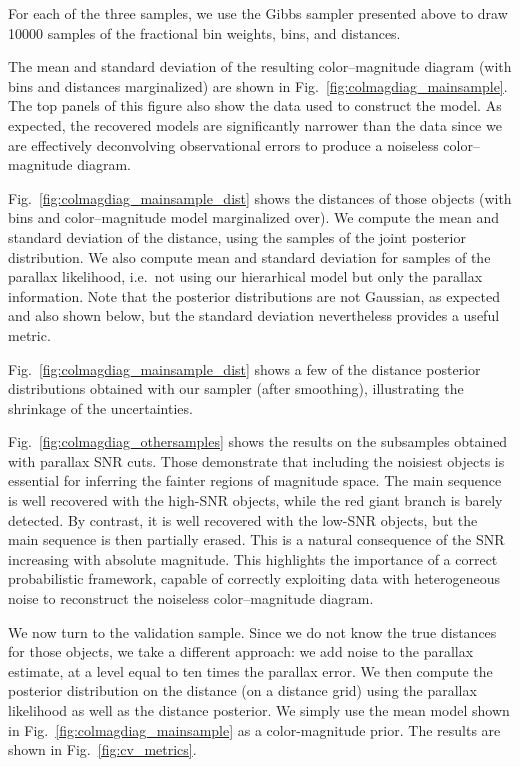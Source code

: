 \documentclass[manuscript, letterpaper]{aastex6}
\newcommand{\ie}{{{i.e.}~}}
\newcommand{\figref}[1]{{\xspace}Fig.~\ref{#1}}
\begin{document}
For each of the three samples, we use the Gibbs sampler presented above to draw 10000 samples of the fractional bin weights, bins, and distances. 

The mean and standard deviation of the resulting color--magnitude diagram (with bins and distances marginalized) are shown in \figref{fig:colmagdiag_mainsample}.
The top panels of this figure also show the data used to construct the model.
As expected, the recovered models are significantly narrower than the data since we are effectively deconvolving observational errors to produce a noiseless color--magnitude diagram. 


\figref{fig:colmagdiag_mainsample_dist} shows the distances of those objects (with bins and color--magnitude model marginalized over). 
We compute the mean and standard deviation of the distance, using the samples of the joint posterior distribution. 
We also compute mean and standard deviation for samples of the parallax likelihood, \ie not using our hierarhical model but only the parallax information.
Note that the posterior distributions are not Gaussian, as expected and also shown below, but the standard deviation nevertheless provides a useful metric. 

\figref{fig:colmagdiag_mainsample_dist} shows a few of the distance posterior distributions obtained with our sampler (after smoothing), illustrating the shrinkage of the uncertainties.

\figref{fig:colmagdiag_othersamples} shows the results on the subsamples obtained with parallax SNR cuts. 
Those demonstrate that including the noisiest objects is essential for inferring the fainter regions of magnitude space.
The main sequence is well recovered with the high-SNR objects, while the red giant branch is barely detected. 
By contrast, it is well recovered with the low-SNR objects, but the main sequence is then partially erased.
This is a natural consequence of the SNR increasing with absolute magnitude.
This highlights the importance of a correct probabilistic framework, capable of correctly exploiting data with heterogeneous noise to reconstruct the noiseless color--magnitude diagram.


We now turn to the validation sample. 
Since we do not know the true distances for those objects, we take a different approach: we add noise to the parallax estimate, at a level equal to ten times the parallax error. 
We then compute the posterior distribution on the distance (on a distance grid) using the parallax likelihood as well as the distance posterior. We simply use the mean model shown in \figref{fig:colmagdiag_mainsample} as a color-magnitude prior. 
The results are shown in \figref{fig:cv_metrics}.
\end{document}
